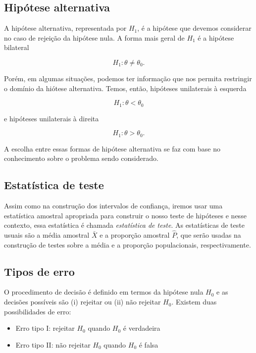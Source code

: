 \documentclass[
]{book}
\providecommand{\tightlist}{%
  \setlength{\itemsep}{0pt}\setlength{\parskip}{0pt}}
\begin{document}
\hypertarget{hipuxf3tese-alternativa}{%
\subsection{Hipótese alternativa}\label{hipuxf3tese-alternativa}}

A hipótese alternativa, representada por \(H_1\), é a hipótese que devemos considerar no caso de rejeição da hipótese nula. A forma mais geral de \(H_1\) é a hipótese bilateral

\[H_1:\theta\ne\theta_0.\]

Porém, em algumas situações, podemos ter informação que nos permita restringir o domínio da hiótese alternativa. Temos, então, hipóteses unilaterais à esquerda

\[H_1:\theta<\theta_0\]

e hipóteses unilaterais à direita

\[H_1:\theta>\theta_0.\]

A escolha entre essas formas de hipótese alternativa se faz com base no conhecimento sobre o problema sendo considerado.

\hypertarget{estatuxedstica-de-teste}{%
\subsection{Estatística de teste}\label{estatuxedstica-de-teste}}

Assim como na construção dos intervalos de confiança, iremos usar uma estatística amostral apropriada para construir o nosso teste de hipóteses e nesse contexto, essa estatística é chamada \emph{estatística de teste}. As estatísticas de teste usuais são a média amostral \(\bar X\) e a proporção amostral \(\hat P\), que serão usadas na construção de testes sobre a média e a proporção populacionais, respectivamente.

\hypertarget{tipos-de-erro}{%
\subsection{Tipos de erro}\label{tipos-de-erro}}

O procedimento de decisão é definido em termos da hipótese nula \(H_0\) e as decisões possíveis são (i) rejeitar ou (ii) não rejeitar \(H_0\). Existem duas possibilidades de erro:

\begin{itemize}
\tightlist
\item
  Erro tipo I: rejeitar \(H_0\) quando \(H_0\) é verdadeira
\item
  Erro tipo II: não rejeitar \(H_0\) quando \(H_0\) é falsa
\end{itemize}
\end{document}

